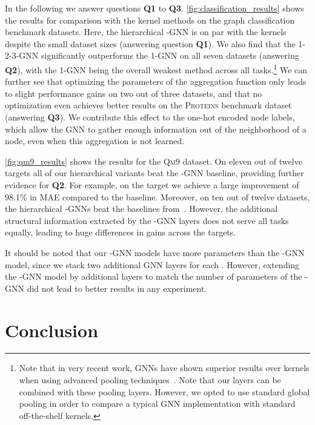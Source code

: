 \documentclass[letterpaper]{article}
\theoremstyle{definition}
\begin{document}
In the following we answer questions \textbf {Q1} to \textbf{Q3}. \cref{fig:classification_results} shows the results for comparison with the kernel methods on the graph classification benchmark datasets. Here, the hierarchical -GNN is on par with the kernels despite the small dataset sizes (answering question \textbf{Q1}).
We also find that the 1-2-3-GNN significantly outperforms the 1-GNN on all seven datasets (answering \textbf{Q2}), with the 1-GNN being the overall weakest method across all tasks.\footnote{Note that in very recent work, GNNs have shown superior results over kernels when using advanced pooling techniques~\cite{Yin+2018}. Note that our layers can be combined with these pooling layers. However, we opted to use standard global pooling in order to compare a typical GNN implementation with standard off-the-shelf kernels.}
We can further see that optimizing the parameters of the aggregation function only leads to slight performance gains on two out of three datasets, and that no optimization even achieves better results on the \textsc{Proteins} benchmark dataset (answering \textbf{Q3}).
We contribute this effect to the one-hot encoded node labels, which allow the GNN to gather enough information out of the neighborhood of a node, even when this aggregation is not learned.

\cref{fig:qm9_results} shows the results for the \textsc{Qm9} dataset. On eleven out of twelve targets all of our hierarchical variants beat the -GNN baseline, providing further evidence for \textbf{Q2}. For example, on the target  we achieve a large improvement of 98.1\% in MAE compared to the baseline. Moreover, on ten out of twelve datasets, the hierarchical -GNNs beat the baselines from~\cite{Wu+2018}.
However, the additional structural information extracted by the -GNN layers does not serve all tasks equally, leading to huge differences in gains across the targets.

It should be noted that our -GNN models have more parameters than the -GNN model, since we stack two additional GNN layers for each . However, extending the -GNN model by additional layers to match the number of parameters of the -GNN did not lead to better results in any experiment.


\section{Conclusion}
\end{document}

